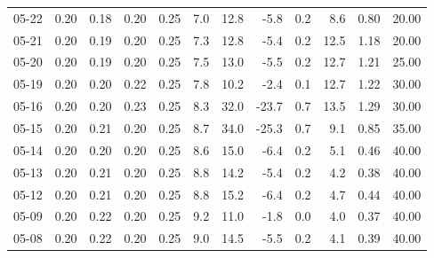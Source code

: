 \begin{threeparttable}
{\begin{tabular}{lrrrrrrrrrrr}
  05-22 &          0.20 &          0.18 &          0.20 &        0.25 &                 7.0 &                12.8 &       -5.8 &                 0.2 &              8.6 &            0.80 &                  20.00 \\
  05-21 &          0.20 &          0.19 &          0.20 &        0.25 &                 7.3 &                12.8 &       -5.4 &                 0.2 &             12.5 &            1.18 &                  20.00 \\
  05-20 &          0.20 &          0.19 &          0.20 &        0.25 &                 7.5 &                13.0 &       -5.5 &                 0.2 &             12.7 &            1.21 &                  25.00 \\
  05-19 &          0.20 &          0.20 &          0.22 &        0.25 &                 7.8 &                10.2 &       -2.4 &                 0.1 &             12.7 &            1.22 &                  30.00 \\
  05-16 &          0.20 &          0.20 &          0.23 &        0.25 &                 8.3 &                32.0 &      -23.7 &                 0.7 &             13.5 &            1.29 &                  30.00 \\
  05-15 &          0.20 &          0.21 &          0.20 &        0.25 &                 8.7 &                34.0 &      -25.3 &                 0.7 &              9.1 &            0.85 &                  35.00 \\
  05-14 &          0.20 &          0.20 &          0.20 &        0.25 &                 8.6 &                15.0 &       -6.4 &                 0.2 &              5.1 &            0.46 &                  40.00 \\
  05-13 &          0.20 &          0.21 &          0.20 &        0.25 &                 8.8 &                14.2 &       -5.4 &                 0.2 &              4.2 &            0.38 &                  40.00 \\
  05-12 &          0.20 &          0.21 &          0.20 &        0.25 &                 8.8 &                15.2 &       -6.4 &                 0.2 &              4.7 &            0.44 &                  40.00 \\
  05-09 &          0.20 &          0.22 &          0.20 &        0.25 &                 9.2 &                11.0 &       -1.8 &                 0.0 &              4.0 &            0.37 &                  40.00 \\
  05-08 &          0.20 &          0.22 &          0.20 &        0.25 &                 9.0 &                14.5 &       -5.5 &                 0.2 &              4.1 &            0.39 &                  40.00 \\

\end{tabular}}
\end{threeparttable}
